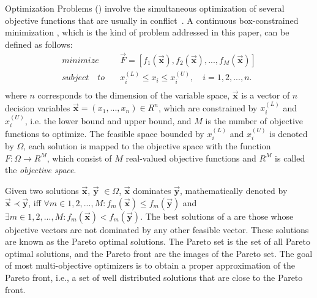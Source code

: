  Optimization Problems (\MOPS{}) %
%
involve the simultaneous optimization of several objective functions that are usually in conflict~\cite{Joel:Kalyanmoy}. 
%
A continuous box-constrained minimization \MOP{}, which is the kind of problem addressed in this paper, can be defined as follows:
\begin{equation}
   \begin{split}
    minimize \quad & \vec{F} = [f_1(\vec{\mathbf{x}}), f_2(\vec{\mathbf{x}}), ..., f_M(\vec{\mathbf{x}})] \\
   subject \quad to \quad &  x_i^{(L)} \leq x_i \leq x_i^{(U)}, \quad i=1,2,..., n. \\
   \end{split}
\end{equation}
where $n$ corresponds to the dimension of the variable space, $\vec{\mathbf{x}}$ is a vector of $n$ 
decision variables $\vec{\mathbf{x}}=(x_1, ..., x_n) \in R^n$, which are constrained by $x_i^{(L)}$ 
and $x_i^{(U)}$, i.e. the lower bound and upper bound, and $M$ is the number of objective functions
to optimize.
%
The feasible space bounded by $x_i^{(L)}$ and $x_i^{(U)}$ is denoted by $\Omega$,
each solution is mapped to the objective space with the function $F : \Omega \rightarrow R^M$, 
which consist of $M$ real-valued objective functions and $R^M$ is called the \textit{objective space}. 

Given two solutions $\vec{\mathbf{x}}$, $\vec{\mathbf{y}}$ $\in \Omega$, $\vec{\mathbf{x}}$ dominates $\vec{\mathbf{y}}$, 
mathematically denoted by $\vec{\mathbf{x}} \prec \vec{\mathbf{y}}$, iff $\forall m \in {1,2,...,M} : 
f_m(\vec{\mathbf{x}}) \leq f_m(\vec{\mathbf{y}})$ and $\exists  m \in {1,2,...,M} : f_m(\vec{\mathbf{x}}) < f_m(\vec{\mathbf{y}})$.
%
The best solutions of a \MOP{} are those whose objective vectors are not dominated by any other feasible vector.
%
These solutions are known as the Pareto optimal solutions.
%
The Pareto set is the set of all Pareto optimal solutions, and the Pareto front are the images of the Pareto set. 
%
The goal of most multi-objective optimizers is to obtain a proper approximation of the Pareto front, i.e., 
a set of well distributed solutions that are close to the Pareto front.

